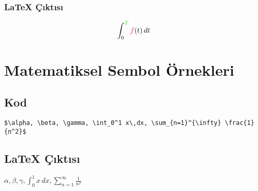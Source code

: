 \documentclass[a4paper,12pt]{article}
\begin{document}
\subsubsection{\LaTeX{} Çıktısı}
\[
\int_0^{\textcolor{green}{T}} \textcolor{magenta}{f}(t)\,dt
\]

\section{Matematiksel Sembol Örnekleri}
\subsection{Kod}
\begin{verbatim}
$\alpha, \beta, \gamma, \int_0^1 x\,dx, \sum_{n=1}^{\infty} \frac{1}{n^2}$
\end{verbatim}

\subsection{\LaTeX{} Çıktısı}
$\alpha, \beta, \gamma, \int_0^1 x\,dx, \sum_{n=1}^{\infty} \frac{1}{n^2}$
\end{document}

